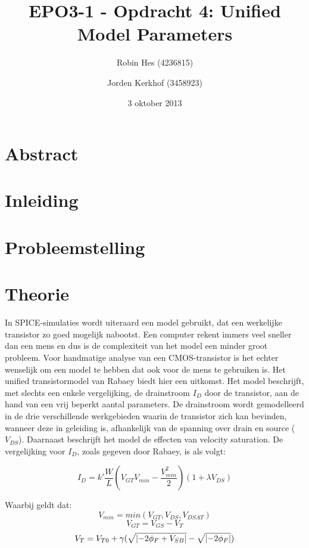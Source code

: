 \documentclass{article}
\author{Robin Hes (4236815) \and Jorden Kerkhof (3458923)}
\title{EPO3-1 - Opdracht 4: Unified Model Parameters}
\date{3 oktober 2013}
\begin{document}
\maketitle

\section{Abstract}
\label{sec:ump-abstr}

\tableofcontents

\section{Inleiding}
\label{sec:ump-inl}

\section{Probleemstelling}
\label{sec:ump-prob}

\section{Theorie}
\label{sec:ump-theorie}
In SPICE-simulaties wordt uiteraard een model gebruikt, dat een werkelijke transistor zo goed mogelijk nabootst. Een computer rekent immers veel sneller dan een mens en dus is de complexiteit van het model een minder groot probleem. Voor handmatige analyse van een CMOS-transistor is het echter wenselijk om een model te hebben dat ook voor de mens te gebruiken is.
Het unified transistormodel van Rabaey biedt hier een uitkomst. Het model beschrijft, met slechts een enkele vergelijking, de drainstroom $I_{D}$ door de transistor, aan de hand van een vrij beperkt aantal parameters. De drainstroom wordt gemodelleerd in de drie verschillende werkgebieden waarin de transistor zich kan bevinden, wanneer deze in geleiding is, afhankelijk van de spanning over drain en source ($V_{DS}$). Daarnaast beschrijft het model de effecten van velocity saturation.
De vergelijking voor $I_{D}$, zoals gegeven door Rabaey, is als volgt:

\begin{equation} \label{eq:ump-cmos-model-rab}
	I_{D} = k' \frac{W}{L} (V_{GT}V_{min} - \frac{V_{min}^2}{2})(1 + \lambda V_{DS})	
\end{equation}

Waarbij geldt dat: \\
$$V_{min} = min(V_{GT}, V_{DS}, V_{DSAT})$$
$$V_{GT} = V_{GS} - V_{T}$$
$$V_{T} = V_{T0} + \gamma ( \sqrt{\lvert-2\phi_{F} + V_{SB}\rvert} - \sqrt{\lvert-2\phi_{F}\rvert} )$$
\cite[101]{rabaey-integrated-circuits}\\
\end{document}
